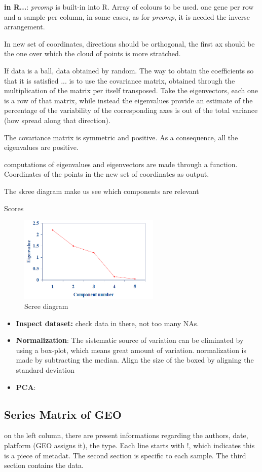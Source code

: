 	\textbf{in R...}: \textit{prcomp} is built-in into R. Array of colours to be used. one gene per row and a sample per column, in some cases, as for \textit{prcomp}, it is needed the inverse arrangement. 

	In new set of coordinates, directions should be orthogonal, the first ax should be the one over which the cloud of points is more stratched. 

	If data is a ball, data obtained by random. The way to obtain the coefficients so that it is satisfied ... is to use the covariance matrix, obtained through the multiplication of the matrix per itself transposed. Take the eigenvectors, each one is a row of that matrix, while instead the eigenvalues provide an estimate of the percentage of the variability of the corresponding axes is out of the total variance (how spread along that direction).

	The covariance matrix is symmetric and positive. As a consequence, all the eigenvalues are positive. 

	computations of eigenvalues and eigenvectors are made through a function. Coordinates of the points in the new set of coordinates as output. 

	The skree diagram make us see which components are relevant

	Scores %


	\begin{figure}[h]
	\caption{Scree diagram}
	\centering
	\includegraphics[width=0.6\textwidth]{skreeDiagram}
	\end{figure}


	\begin{itemize}
		\item \textbf{Inspect dataset:} check data in there, not too many NAs. 
		\item \textbf{Normalization}: The sistematic source of variation can be eliminated by using a box-plot, which means great amount of variation. normalization is made by subtracting the median.
	Align the size of the boxed by aligning the standard deviation
		\item \textbf{PCA}:
	\end{itemize}



	\subsection{Series Matrix of GEO}
	on the left column, there are present informations regarding the authors, date, platform (GEO assigns it), the type. Each line starts with !, which indicates this is a piece of metadat. The second section is specific to each sample. The third section contains the data. 



